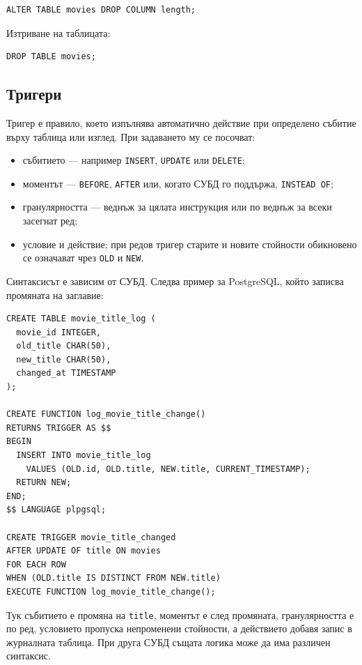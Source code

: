 \begin{verbatim}
ALTER TABLE movies DROP COLUMN length;
\end{verbatim}

Изтриване на таблицата:

\begin{verbatim}
DROP TABLE movies;
\end{verbatim}

\subsection{Тригери}\label{s:23.5.3}

Тригер е правило, което изпълнява автоматично действие при определено събитие върху таблица или изглед. При задаването му се посочват:

\begin{itemize}
    \item събитието --- например \texttt{INSERT}, \texttt{UPDATE} или \texttt{DELETE};
    \item моментът --- \texttt{BEFORE}, \texttt{AFTER} или, когато СУБД го поддържа, \texttt{INSTEAD OF};
    \item гранулярността --- веднъж за цялата инструкция или по веднъж за всеки засегнат ред;
    \item условие и действие; при редов тригер старите и новите стойности обикновено се означават чрез \texttt{OLD} и \texttt{NEW}.
\end{itemize}

Синтаксисът е зависим от СУБД. Следва пример за PostgreSQL, който записва промяната на заглавие:

\begin{verbatim}
CREATE TABLE movie_title_log (
  movie_id INTEGER,
  old_title CHAR(50),
  new_title CHAR(50),
  changed_at TIMESTAMP
);

CREATE FUNCTION log_movie_title_change()
RETURNS TRIGGER AS $$
BEGIN
  INSERT INTO movie_title_log
    VALUES (OLD.id, OLD.title, NEW.title, CURRENT_TIMESTAMP);
  RETURN NEW;
END;
$$ LANGUAGE plpgsql;

CREATE TRIGGER movie_title_changed
AFTER UPDATE OF title ON movies
FOR EACH ROW
WHEN (OLD.title IS DISTINCT FROM NEW.title)
EXECUTE FUNCTION log_movie_title_change();
\end{verbatim}

Тук събитието е промяна на \texttt{title}, моментът е след промяната, гранулярността е по ред, условието пропуска непроменени стойности, а действието добавя запис в журналната таблица. При друга СУБД същата логика може да има различен синтаксис.

